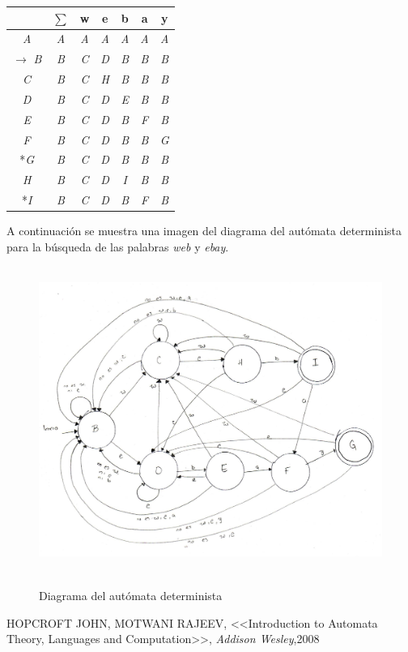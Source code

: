 \documentclass[12pt,letterpaper]{article}
\begin{document}
\begin{center}
\begin{tabular}{| c || c | c | c | c | c | c |} \hline
 & $ \sum $ & w & e & b & a & y \\
\hline\hline
\textit{A} & \textit{A} & \textit{A} & \textit{A} & \textit{A} & \textit{A} & \textit{A} \\
\hline
$\rightarrow$ \textit{B} & \textit{B} & \textit{C} & \textit{D} & \textit{B} & \textit{B} & \textit{B} \\
\hline
\textit{C} & \textit{B} & \textit{C} & \textit{H} & \textit{B} & \textit{B} & \textit{B} \\
\hline
\textit{D} & \textit{B} & \textit{C} & \textit{D} & \textit{E} & \textit{B} & \textit{B} \\
\hline
\textit{E} & \textit{B} & \textit{C} & \textit{D} & \textit{B} & \textit{F} & \textit{B} \\
\hline
\textit{F} & \textit{B} & \textit{C} & \textit{D} & \textit{B} & \textit{B} & \textit{G} \\
\hline
*\textit{G} & \textit{B} & \textit{C} & \textit{D} & \textit{B} & \textit{B} & \textit{B} \\
\hline
\textit{H} & \textit{B} & \textit{C} & \textit{D} & \textit{I} & \textit{B} & \textit{B} \\
\hline
*\textit{I} & \textit{B} & \textit{C} & \textit{D} & \textit{B} & \textit{F} & \textit{B} \\
\hline
     
\end{tabular}
\end{center}
\justify
A continuaci\'on se muestra una imagen del diagrama del aut\'omata determinista para la b\'usqueda de las palabras \textit{web} y \textit{ebay}.\\

\begin{figure}[H]
\includegraphics[width=\textwidth, height=10cm]{busqueda.jpg}
\label{fig: busqueda}
\caption{Diagrama del aut\'omata determinista}
\end{figure}
\begin{thebibliography}{X}
 \textsc{	HOPCROFT JOHN, MOTWANI RAJEEV},
<<Introduction to Automata Theory,
Languages and Computation>>,
\textit{Addison Wesley},2008
\end{thebibliography}
\end{document}
